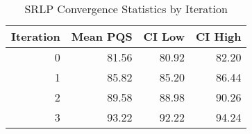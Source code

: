 \begin{table}[htbp]
\centering
\caption{SRLP Convergence Statistics by Iteration}
\label{tab:convergence}
\begin{tabular}{rrrr}
\toprule
Iteration & Mean PQS & CI Low & CI High \\
\midrule
0 & 81.56 & 80.92 & 82.20 \\
1 & 85.82 & 85.20 & 86.44 \\
2 & 89.58 & 88.98 & 90.26 \\
3 & 93.22 & 92.22 & 94.24 \\
\bottomrule
\end{tabular}
\end{table}